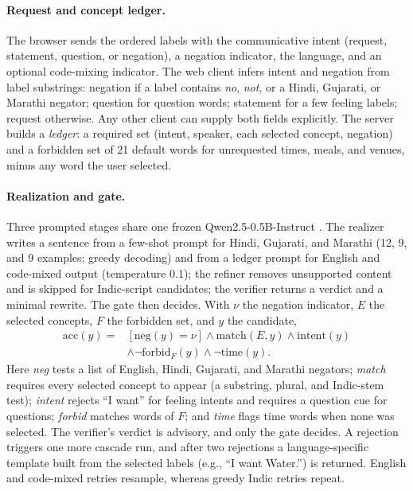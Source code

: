 \paragraph{Request and concept ledger.}
The browser sends the ordered labels with the communicative intent (request, statement, question, or negation), a negation indicator, the language, and an optional code-mixing indicator.
The web client infers intent and negation from label substrings: negation if a label contains \emph{no}, \emph{not}, or a Hindi, Gujarati, or Marathi negator; question for question words; statement for a few feeling labels; request otherwise.
Any other client can supply both fields explicitly.
The server builds a \emph{ledger}: a required set (intent, speaker, each selected concept, negation) and a forbidden set of 21 default words for unrequested times, meals, and venues, minus any word the user selected.

\paragraph{Realization and gate.}
Three prompted stages share one frozen Qwen2.5-0.5B-Instruct \citep{qwen2025qwen25}.
The realizer writes a sentence from a few-shot prompt for Hindi, Gujarati, and Marathi (12, 9, and 9 examples; greedy decoding) and from a ledger prompt for English and code-mixed output (temperature 0.1); the refiner removes unsupported content and is skipped for Indic-script candidates; the verifier returns a verdict and a minimal rewrite.
The gate then decides.
With $\nu$ the negation indicator, $E$ the selected concepts, $F$ the forbidden set, and $y$ the candidate,
\begin{equation}
\begin{split}
\mathrm{acc}(y)={}&[\mathrm{neg}(y)=\nu]\wedge\mathrm{match}(E,y)\wedge\mathrm{intent}(y)\\
&\wedge\neg\mathrm{forbid}_F(y)\wedge\neg\mathrm{time}(y).
\end{split}
\label{eq:gate}
\end{equation}
Here \emph{neg} tests a list of English, Hindi, Gujarati, and Marathi negators; \emph{match} requires every selected concept to appear (a substring, plural, and Indic-stem test); \emph{intent} rejects ``I want'' for feeling intents and requires a question cue for questions; \emph{forbid} matches words of $F$; and \emph{time} flags time words when none was selected.
The verifier's verdict is advisory, and only the gate decides.
A rejection triggers one more cascade run, and after two rejections a language-specific template built from the selected labels (e.g., ``I want Water.'') is returned.
English and code-mixed retries resample, whereas greedy Indic retries repeat.

